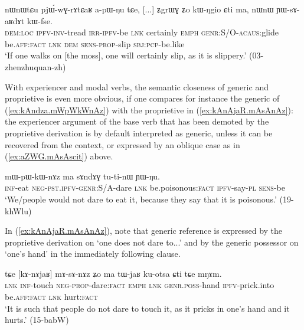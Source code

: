 \begin{exe}
\ex \label{ex:kWNGio.YWsaRdAt}
\gll nɯnɯtɕu pjɯ́-wɣ-rɤtɕaʁ a-pɯ-ŋu tɕe, [...] ʑgrɯɣ ʑo kɯ-ŋgio ɕti ma, nɯnɯ ɲɯ-sɤ-aʁdɤt kɯ-fse. \\
\textsc{dem}:\textsc{loc} \textsc{ipfv}-\textsc{inv}-tread \textsc{irr}-\textsc{ipfv}-be \textsc{lnk} { } certainly \textsc{emph} \textsc{genr}:S/O-\textsc{acaus}:glide be.\textsc{aff}:\textsc{fact} \textsc{lnk} \textsc{dem} \textsc{sens}-\textsc{prop}-slip \textsc{sbj}:\textsc{pcp}-be.like \\
\glt `If one walks on [the moss], one will certainly slip, as it is slippery.' (03-zhenzhuquan-zh) 
\end{exe}

With experiencer and modal verbs, the semantic closeness of generic and proprietive is even more obvious, if one compares for instance the generic of  (\ref{ex:kAndza.mWpWkWnAz}) with the proprietive    in (\ref{ex:kAnAjaR.mAsAnAz}): the experiencer argument of the base verb that has been demoted by the proprietive derivation is by default interpreted as generic, unless it can be recovered from the context, or expressed by an oblique case as in (\ref{ex:aZWG.mAsAscit}) above.

\begin{exe}
\ex \label{ex:kAndza.mWpWkWnAz}
\gll [kɤ-ndza] mɯ-pɯ-kɯ-nɤz ma sɤndɤɣ tu-ti-nɯ ɲɯ-ŋu. \\
\textsc{inf}-eat \textsc{neg}-\textsc{pst}.\textsc{ipfv}-\textsc{genr}:S/A-dare \textsc{lnk} be.poisonous:\textsc{fact} \textsc{ipfv}-say-\textsc{pl} \textsc{sens}-be \\
\glt `We/people would not dare to eat it, because they say that it is poisonous.' (19-khWlu)
\end{exe}

In (\ref{ex:kAnAjaR.mAsAnAz}), note that generic reference is expressed by the proprietive derivation on  `one does not dare to...' and by the generic possessor on  `one's hand' in the immediately following clause.

\begin{exe}
\ex \label{ex:kAnAjaR.mAsAnAz}
\gll tɕe [kɤ-nɤjaʁ] mɤ-sɤ-nɤz ʑo ma tɯ-jaʁ ku-otsa ɕti tɕe mŋɤm. \\
\textsc{lnk} \textsc{inf}-touch \textsc{neg}-\textsc{prop}-dare:\textsc{fact} \textsc{emph} \textsc{lnk} \textsc{genr}.\textsc{poss}-hand \textsc{ipfv}-prick.into be.\textsc{aff}:\textsc{fact} \textsc{lnk} hurt:\textsc{fact} \\
\glt `It is such that people do not dare to touch it, as it pricks in one's hand and it hurts.' (15-babW)
\end{exe}

